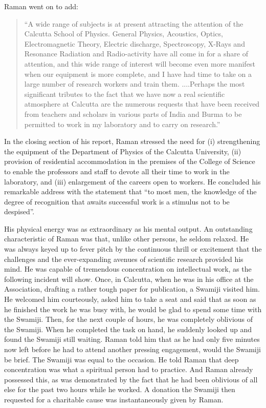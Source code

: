 Raman went on to add:
\begin{quote}
{\fontsize{10pt}{12pt}\selectfont
``A wide range of subjects is at present attracting the attention of the Calcutta School of Physics. General Physics, Acoustics, Optics, Electromagnetic Theory, Electric discharge, Spectroscopy, X-Rays and Resonance Radiation and Radio-activity have all come in for a share of attention, and this wide range of interest will become even more manifest when our equipment is more complete, and I have had time to take on a large number of research workers and train them. ....Perhaps the most significant tributes to the fact that we have now a real scientific atmosphere at Calcutta are the numerous requests that have been received from teachers and scholars in various parts of India and Burma to be permitted to work in my laboratory and to carry on research.''}\relax
\end{quote}

In the closing section of his report, Raman stressed the need for (i) strengthening the equipment of the Department of Physics of the Calcutta University, (ii) provision of residential accommodation in the premises of the College of Science to enable the professors and staff to devote all their time to work in the laboratory, and (iii) enlargement of the careers open to workers. He concluded his remarkable address with the statement that ``to most men, the knowledge of the degree of recognition that awaits successful work is a stimulus not to be despised''.

His physical energy was as extraordinary as his mental output. An outstanding characteristic of Raman was that, unlike other persons, he seldom relaxed. He was always keyed up to fever pitch by the continuous thrill or excitement that the challenges and the ever-expanding avenues of scientific research provided his mind. He was capable of tremendous concentration on intellectual work, as the following incident will show. Once, in Calcutta, when he was in his office at the Association, drafting a rather tough paper for publication, a Swamiji visited him. He welcomed him courteously, asked him to take a seat and said that as soon as he finished the work he was busy with, he would be glad to spend some time with the Swamiji. Then, for the next couple of hours, he was completely oblivious of the Swamiji. When he completed the task on hand, he suddenly looked up and found the Swamiji still waiting. Raman told him that as he had only five minutes now left before he had to attend another pressing engagement, would the Swamiji be brief. The Swamiji was equal to the occasion. He told Raman that deep concentration was what a spiritual person had to practice. And Raman already possessed this, as was demonstrated by the fact that he had been oblivious of all else for the past two hours while he worked. A donation the Swamiji then requested for a charitable cause was instantaneously given by Raman.

